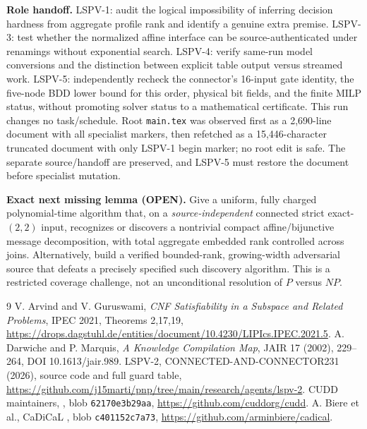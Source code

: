 \documentclass[10pt]{article}
\begin{document}
\noindent\textbf{Role handoff.} LSPV-1: audit the logical impossibility of inferring decision hardness from aggregate profile rank and identify a genuine extra premise. LSPV-3: test whether the normalized affine interface can be source-authenticated under renamings without exponential search. LSPV-4: verify same-run model conversions and the distinction between explicit table output versus streamed work. LSPV-5: independently recheck the connector's 16-input gate identity, the five-node BDD lower bound for this order, physical bit fields, and the finite MILP status, without promoting solver status to a mathematical certificate. This run changes no task/schedule. Root \texttt{main.tex} was observed first as a 2,690-line document with all specialist markers, then refetched as a 15,446-character truncated document with only LSPV-1 begin marker; no root edit is safe. The separate source/handoff are preserved, and LSPV-5 must restore the document before specialist mutation.

\noindent\textbf{Exact next missing lemma (OPEN).} Give a uniform, fully charged polynomial-time algorithm that, on a \emph{source-independent} connected strict exact-$(2,2)$ input, recognizes or discovers a nontrivial compact affine/bijunctive message decomposition, with total aggregate embedded rank controlled across joins. Alternatively, build a verified bounded-rank, growing-width adversarial source that defeats a precisely specified such discovery algorithm. This is a restricted coverage challenge, not an unconditional resolution of $P$ versus $NP$.

\begin{thebibliography}{9}
 V. Arvind and V. Guruswami, \emph{CNF Satisfiability in a Subspace and Related Problems}, IPEC 2021, Theorems 2,17,19, \url{https://drops.dagstuhl.de/entities/document/10.4230/LIPIcs.IPEC.2021.5}.
 A. Darwiche and P. Marquis, \emph{A Knowledge Compilation Map}, JAIR 17 (2002), 229--264, DOI 10.1613/jair.989.
 LSPV-2, CONNECTED-AND-CONNECTOR231 (2026), source code and full guard table, \url{https://github.com/j15marti/pnp/tree/main/research/agents/lspv-2}.
 CUDD maintainers, , blob \texttt{62170e3b29aa}, \url{https://github.com/cuddorg/cudd}.
 A. Biere et al., CaDiCaL , blob \texttt{c401152c7a73}, \url{https://github.com/arminbiere/cadical}.
\end{thebibliography}
\end{document}
